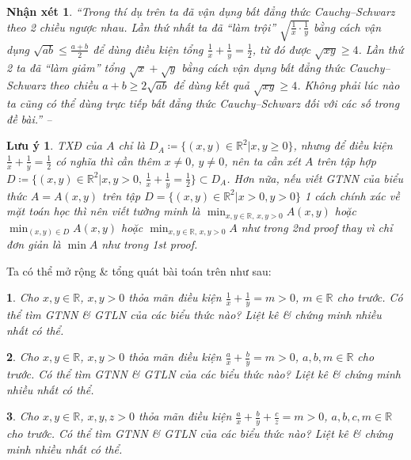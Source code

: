 \documentclass{article}
\newtheorem{baitoan}{}
\newtheorem{luuy}{Lưu ý}
\newtheorem{nhanxet}{Nhận xét}
\begin{document}
\begin{nhanxet}
	``Trong thí dụ trên ta đã vận dụng bất đẳng thức Cauchy--Schwarz theo 2 chiều ngược nhau. Lần thứ nhất ta đã ``làm trội'' $\sqrt{\frac{1}{x}\cdot\frac{1}{y}}$ bằng cách vận dụng $\sqrt{ab}\le\frac{a + b}{2}$ để dùng điều kiện tổng $\frac{1}{x} + \frac{1}{y} = \frac{1}{2}$, từ đó được $\sqrt{xy}\ge4$. Lần thứ 2 ta đã ``làm giảm'' tổng $\sqrt{x} + \sqrt{y}$ bằng cách vận dụng bất đẳng thức Cauchy--Schwarz theo chiều $a + b\ge2\sqrt{ab}$ để dùng kết quả $\sqrt{xy}\ge4$. Không phải lúc nào ta cũng có thể dùng trực tiếp bất đẳng thức Cauchy--Schwarz đối với các số trong đề bài.'' -- \emph{\cite[p. 24]{Tuyen_Toan_9}}
\end{nhanxet}

\begin{luuy}
	TXĐ của $A$ chỉ là $D_A\coloneqq\{(x,y)\in\mathbb{R}^2|x,y\ge0\}$, nhưng để điều kiện $\frac{1}{x} + \frac{1}{y} = \frac{1}{2}$ có nghĩa thì cần thêm $x\ne0$, $y\ne0$, nên ta cần xét $A$ trên tập hợp $D\coloneqq\{(x,y)\in\mathbb{R}^2|x,y > 0,\,\frac{1}{x} + \frac{1}{y} = \frac{1}{2}\}\subset D_A$. Hơn nữa, nếu viết {\rm GTNN} của biểu thức $A = A(x,y)$ trên tập $D = \{(x,y)\in\mathbb{R}^2|x > 0,y > 0\}$ 1 cách chính xác về mặt toán học thì nên viết tường minh là $\min_{x,y\in\mathbb{R},\,x,y > 0} A(x,y)$ hoặc $\min_{(x,y)\in D} A(x,y)$ hoặc $\min_{x,y\in\mathbb{R},\,x,y > 0} A$ như trong 2nd proof thay vì chỉ đơn giản là $\min A$ như trong 1st proof.
\end{luuy}
Ta có thể mở rộng \& tổng quát bài toán trên như sau:

\begin{baitoan}
	Cho $x,y\in\mathbb{R}$, $x,y > 0$ thỏa mãn điều kiện $\frac{1}{x} + \frac{1}{y} = m > 0$, $m\in\mathbb{R}$ cho trước. Có thể tìm {\rm GTNN} \& {\rm GTLN} của các biểu thức nào? Liệt kê \& chứng minh nhiều nhất có thể.
\end{baitoan}

\begin{baitoan}
	Cho $x,y\in\mathbb{R}$, $x,y > 0$ thỏa mãn điều kiện $\frac{a}{x} + \frac{b}{y} = m > 0$, $a,b,m\in\mathbb{R}$ cho trước. Có thể tìm {\rm GTNN} \& {\rm GTLN} của các biểu thức nào? Liệt kê \& chứng minh nhiều nhất có thể.
\end{baitoan}

\begin{baitoan}
	Cho $x,y\in\mathbb{R}$, $x,y,z > 0$ thỏa mãn điều kiện $\frac{a}{x} + \frac{b}{y} + \frac{c}{z} = m > 0$, $a,b,c,m\in\mathbb{R}$ cho trước. Có thể tìm {\rm GTNN} \& {\rm GTLN} của các biểu thức nào? Liệt kê \& chứng minh nhiều nhất có thể.
\end{baitoan}
\end{document}
